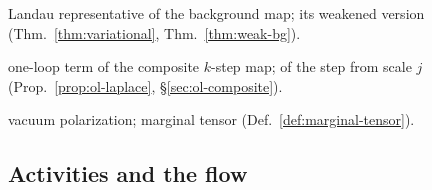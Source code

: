 {\begin{description}[font=\normalfont,style=nextline,leftmargin=10em,labelwidth=9.5em,labelsep=0.5em,itemsep=1pt,parsep=0pt,topsep=4pt]
\item[$A_*(B)$, $A_*(s;B)$] Landau representative of the background map; its weakened version (Thm.~\ref{thm:variational}, Thm.~\ref{thm:weak-bg}).
\item[$\Gamma^{(1)}_k$, $\Gamma^{\rm step}_j$] one-loop term of the composite $k$-step map; of the step from scale $j$ (Prop.~\ref{prop:ol-laplace}, \S\ref{sec:ol-composite}).
\item[$\Pi_\Phi$, $T_\Phi$] vacuum polarization; marginal tensor (Def.~\ref{def:marginal-tensor}).
\end{description}}

\subsection*{Activities and the flow}

